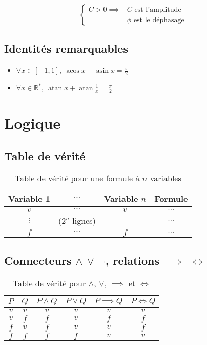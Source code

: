 \documentclass{article}
\newcommand{\R}{{\mathbb R}}
\begin{document}
\[
	
	\begin{cases}
		C > 0 \implies &\text{$C$ est l'amplitude} \\
					   &\text{$\phi$ est le déphasage}
	\end{cases}
\] 
\subsection{Identités remarquables}
\begin{itemize}
	\item $\forall x \in [-1, 1],\ \operatorname{acos} x + \operatorname{asin} x = \frac{\pi}{2}$
	\item $\forall x \in \R^\ast,\ \operatorname{atan} x + \operatorname{atan} \frac{1}{x} = \frac{\pi}{2}$
\end{itemize}


\section{Logique}

\subsection{Table de vérité}

\begin{table}[H]
	\centering
	\begin{tabular}{ccc|c}
	Variable 1 & $\cdots$ & Variable $n$ & Formule \\\hline
	$v$ & $\cdots$ & $v$ & $\ldots$ \\
	$\vdots$ & ($2^n$ lignes) & & $\ldots$\\
	$f$ & $\cdots$ & $f$ & $\ldots$
	\end{tabular}
	\caption{Table de vérité pour une formule à $n$ variables}
	\label{tab:table_verité_cas_général}
\end{table}

\subsection{Connecteurs $\land$ $\lor$ $\lnot$, relations $\implies$ $\iff$}

\begin{table}[H]
	\centering
	\begin{tabular}{cc|cccc}
	$P$ & $Q$ & $P\land Q$ & $P \lor Q$ & $P \implies Q$ & $P \iff Q$ \\\hline
	$v$ & $v$ & $v$ & $v$ & $v$ & $v$ \\
	$v$ & $f$ & $f$ & $v$ & $f$ & $f$ \\
	$f$ & $v$ & $f$ & $v$ & $v$ & $f$ \\
	$f$ & $f$ & $f$ & $f$ & $v$ & $v$ \\
	\end{tabular}
	\caption{Table de vérité pour $\land$, $\lor$, $\implies$ et $\iff$}
	\label{tab:table_vérité_et_ou_implication_équivalence}
\end{table}
\end{document}
